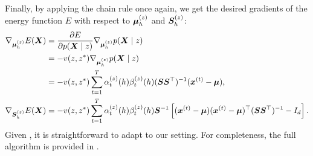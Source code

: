 Finally, by applying the chain rule once again, we get the desired gradients of the energy function $E$ with respect to ${\bm{\mu}}^{(z)}_h$ and ${\bm{S}}^{(z)}_h$:
\begin{align}
\nabla_{{\bm{\mu}}^{(z)}_h} E({\bm{X}}) &= \frac{\partial E}{\partial p({\bm{X}} \mid z)} \nabla_{{\bm{\mu}}^{(z)}_h} p({\bm{X}} \mid z) \nonumber\\
&= -v(z, z^*) \nabla_{{\bm{\mu}}^{(z)}_h} p({\bm{X}} \mid z) \nonumber\\
&= -v(z, z^*) \sum_{t=1}^T \alpha_{t}^{(z)}(h) \beta_{t}^{(z)}(h) ({\bm{S}} {\bm{S}} ^\top)^{-1} ({\bm{x}}^{(t)} - {\bm{\mu}}), \label{eq:sohmmm_grad_mu}\\
\nabla_{{\bm{S}}^{(z)}_h} E({\bm{X}}) &= -v(z, z^*) \sum_{t=1}^T \alpha_{t}^{(z)}(h) \beta_{t}^{(z)}(h) {\bm{S}}^{-1} \left[ ({\bm{x}}^{(t)} - {\bm{\mu}}) ({\bm{x}}^{(t)} - {\bm{\mu}})^\top ({\bm{S}} {\bm{S}} ^\top)^{-1} - I_d\right]. \label{eq:sohmmm_grad_s}
\end{align}
Given , it is straightforward to adapt  to our setting. For completeness, the full algorithm is provided in .

